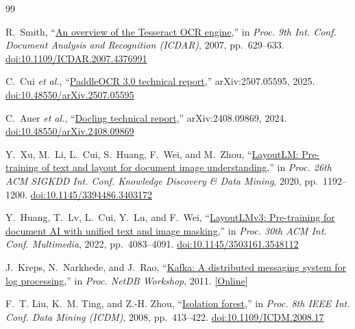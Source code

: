\begin{thebibliography}{99}

R.~Smith, ``\href{https://doi.org/10.1109/ICDAR.2007.4376991}{An overview of the Tesseract OCR engine},'' in \emph{Proc. 9th Int. Conf. Document Analysis and Recognition (ICDAR)}, 2007, pp.~629--633. \href{https://doi.org/10.1109/ICDAR.2007.4376991}{doi:10.1109/ICDAR.2007.4376991}

C.~Cui \emph{et al.}, ``\href{https://arxiv.org/abs/2507.05595}{PaddleOCR 3.0 technical report},'' arXiv:2507.05595, 2025. \href{https://doi.org/10.48550/arXiv.2507.05595}{doi:10.48550/arXiv.2507.05595}

C.~Auer \emph{et al.}, ``\href{https://arxiv.org/abs/2408.09869}{Docling technical report},'' arXiv:2408.09869, 2024. \href{https://doi.org/10.48550/arXiv.2408.09869}{doi:10.48550/arXiv.2408.09869}

Y.~Xu, M.~Li, L.~Cui, S.~Huang, F.~Wei, and M.~Zhou, ``\href{https://doi.org/10.1145/3394486.3403172}{LayoutLM: Pre-training of text and layout for document image understanding},'' in \emph{Proc. 26th ACM SIGKDD Int. Conf. Knowledge Discovery \& Data Mining}, 2020, pp.~1192--1200. \href{https://doi.org/10.1145/3394486.3403172}{doi:10.1145/3394486.3403172}

Y.~Huang, T.~Lv, L.~Cui, Y.~Lu, and F.~Wei, ``\href{https://doi.org/10.1145/3503161.3548112}{LayoutLMv3: Pre-training for document AI with unified text and image masking},'' in \emph{Proc. 30th ACM Int. Conf. Multimedia}, 2022, pp.~4083--4091. \href{https://doi.org/10.1145/3503161.3548112}{doi:10.1145/3503161.3548112}

J.~Kreps, N.~Narkhede, and J.~Rao, ``\href{https://www.microsoft.com/en-us/research/wp-content/uploads/2017/09/Kafka.pdf}{Kafka: A distributed messaging system for log processing},'' in \emph{Proc. NetDB Workshop}, 2011. \href{https://www.microsoft.com/en-us/research/wp-content/uploads/2017/09/Kafka.pdf}{[Online]}

F.~T. Liu, K.~M. Ting, and Z.-H. Zhou, ``\href{https://doi.org/10.1109/ICDM.2008.17}{Isolation forest},'' in \emph{Proc. 8th IEEE Int. Conf. Data Mining (ICDM)}, 2008, pp.~413--422. \href{https://doi.org/10.1109/ICDM.2008.17}{doi:10.1109/ICDM.2008.17}


\end{thebibliography}
